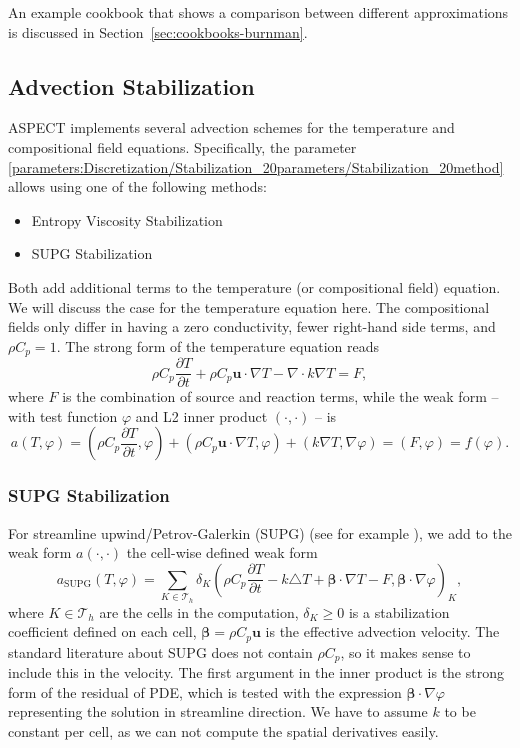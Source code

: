 \documentclass{article}
\newcommand{\aspect}{\textsc{ASPECT}}
\begin{document}
An example cookbook that shows a comparison between different approximations is discussed in Section~\ref{sec:cookbooks-burnman}.

\subsection{Advection Stabilization}
\label{sec:advection-stabilization}

\aspect{} implements several advection schemes for the temperature and compositional field
equations. Specifically, the parameter \ref{parameters:Discretization/Stabilization_20parameters/Stabilization_20method}
allows using one of the following methods:

\begin{itemize}
 \item Entropy Viscosity Stabilization
 \item SUPG Stabilization
\end{itemize}


Both add additional terms to the temperature (or compositional field) equation. We will discuss
the case for the temperature equation here. The compositional fields only differ in having
a zero conductivity, fewer right-hand side terms, and $\rho C_p=1$. The strong form of the temperature equation reads
\[
 \rho C_p \frac{\partial T}{\partial t} + \rho C_p \mathbf{u} \cdot \nabla T - \nabla \cdot k\nabla T = F,
\]
where $F$ is the combination of source and reaction terms,
while the weak form -- with test function $\varphi$ and L2 inner product $(\cdot,\cdot)$ -- is
\begin{equation}
a(T,\varphi) =
 \left(\rho C_p \frac{\partial T}{\partial t}, \varphi \right)
 + \left(\rho C_p \mathbf{u} \cdot \nabla T, \varphi \right)
 + \left( k \nabla T, \nabla \varphi \right) = (F,\varphi) = f(\varphi).
 \label{eqn:weak-form-for-advection}
\end{equation}

\subsubsection{SUPG Stabilization}

For streamline upwind/Petrov-Galerkin (SUPG) (see for example \cite{JohnKnobloch2006,dealiistep63}), we add to the weak form $a(\cdot,\cdot)$ the cell-wise defined weak form
\[
a_{\text{SUPG}} (T, \varphi) =
 \sum_{K \in \mathcal{T}_h}
  \delta_K \left( \rho C_p \frac{\partial T}{\partial t} - k \triangle T + \mathbf{\beta} \cdot \nabla T - F, \mathbf{\beta} \cdot \nabla \varphi \right)_K,
\]
where $K \in \mathcal{T}_h$ are the cells in the computation, $\delta_K \geq 0$ is a stabilization coefficient
defined on each cell, $\mathbf{\beta} = \rho C_p \mathbf{u}$ is the effective advection velocity.
The standard literature about SUPG does not contain $\rho C_p$, so it makes sense to include this in the
velocity.
The first argument in the inner product is the strong form of the residual of PDE, which
is tested with the expression $\mathbf{\beta} \cdot \nabla \varphi$ representing the solution in
streamline direction. We have to assume $k$ to be
constant per cell, as we can not compute the spatial derivatives easily.
\end{document}
